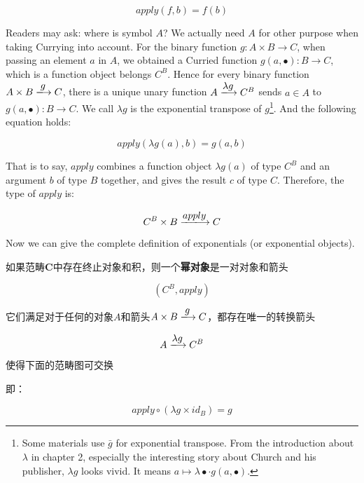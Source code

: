 \documentclass{article}
\begin{document}
\[
apply(f, b) = f(b)
\]

Readers may ask: where is symbol $A$? We actually need $A$ for other purpose when taking Currying into account. For the binary function $g: A \times B \to C$, when passing an element $a$ in $A$, we obtained a Curried function $g(a, \bullet) : B \to C$, which is a function object belongs $C^B$. Hence for every binary function $A \times B \arrowto{g} C$, there is a unique unary function $A \arrowto{\lambda g} C^B$ sends $a \in A$ to $g(a, \bullet) : B \to C$. We call $\lambda g$ is the exponential transpose of $g$\footnote{Some materials use $\bar{g}$ for exponential transpose. From the introduction about $\lambda$ in chapter 2, especially the interesting story about Church and his publisher, $\lambda g$ looks vivid. It means $a \mapsto \lambda \bullet \cdot g(a, \bullet)$.}. And the following equation holds:

\[
apply(\lambda g(a), b) = g(a, b)
\]

That is to say, $apply$ combines a function object $\lambda g(a)$ of type $C^B$ and an argument $b$ of type $B$ together, and gives the result $c$ of type $C$. Therefore, the type of $apply$ is:

\[
C^B \times B \arrowto{apply} C
\]

 
Now we can give the complete definition of exponentials (or exponential objects).

\begin{definition}
如果范畴$\pmb{C}$中存在终止对象和积，则一个\textbf{幂对象}是一对对象和箭头

\[
(C^B, apply)
\]

它们满足对于任何的对象$A$和箭头$A \times B \arrowto{g} C$，都存在唯一的转换箭头

\[
 A \arrowto{\lambda g} C^B
\]

使得下面的范畴图可交换

\begin{center}
\end{center}

即：

\[
  apply \circ (\lambda g \times id_B) = g
\]

\end{definition}
\end{document}

